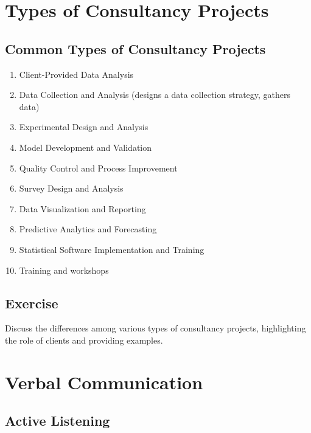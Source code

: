 \documentclass[
  letterpaper,
  DIV=11,
  numbers=noendperiod]{scrreprt}
\begin{document}

\chapter{Types of Consultancy
Projects}\label{types-of-consultancy-projects}

\section{Common Types of Consultancy
Projects}\label{common-types-of-consultancy-projects}

\begin{enumerate}
\def\labelenumi{\arabic{enumi}.}
\item
  Client-Provided Data Analysis
\item
  Data Collection and Analysis (designs a data collection strategy,
  gathers data)
\item
  Experimental Design and Analysis
\item
  Model Development and Validation
\item
  Quality Control and Process Improvement
\item
  Survey Design and Analysis
\item
  Data Visualization and Reporting
\item
  Predictive Analytics and Forecasting
\item
  Statistical Software Implementation and Training
\item
  Training and workshops
\end{enumerate}

\section{Exercise}\label{exercise-2}

Discuss the differences among various types of consultancy projects,
highlighting the role of clients and providing examples.


\chapter{Verbal Communication}\label{verbal-communication}

\section{Active Listening}\label{active-listening}
\end{document}

